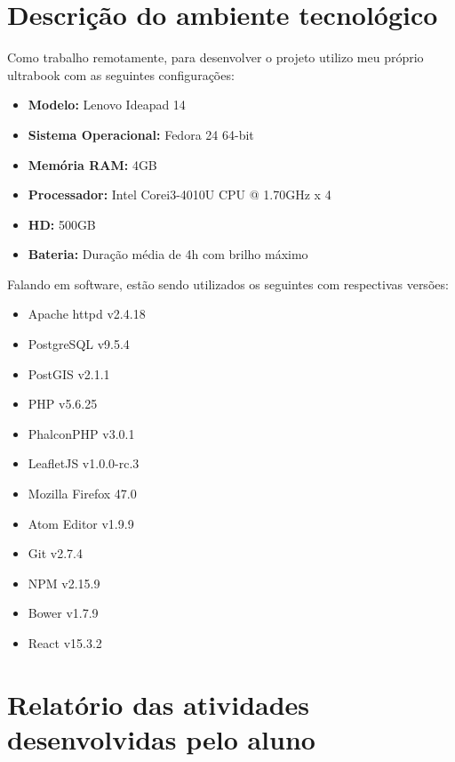 \documentclass{ufscar}
\begin{document}
\section{Descrição do ambiente tecnológico}
Como trabalho remotamente, para desenvolver o projeto utilizo meu próprio ultrabook com as seguintes configurações:
\begin{itemize}
  \item \textbf{Modelo:} Lenovo Ideapad 14
  \item \textbf{Sistema Operacional:} Fedora 24 64-bit
  \item \textbf{Memória RAM:} 4GB
  \item \textbf{Processador:} Intel\textsuperscript{\textregistered} Core\texttrademark  i3-4010U CPU @ 1.70GHz x 4
  \item \textbf{HD:} 500GB
  \item \textbf{Bateria:} Duração média de 4h com brilho máximo
\end{itemize}
Falando em software, estão sendo utilizados os seguintes com respectivas versões:
\begin{itemize}
  \item Apache httpd v2.4.18
  \item PostgreSQL v9.5.4
  \item PostGIS v2.1.1
  \item PHP v5.6.25
  \item PhalconPHP v3.0.1
  \item LeafletJS v1.0.0-rc.3
  \item Mozilla Firefox 47.0
  \item Atom Editor v1.9.9
  \item Git v2.7.4
  \item NPM v2.15.9
  \item Bower v1.7.9
  \item React v15.3.2
\end{itemize}

\section{Relatório das atividades desenvolvidas pelo aluno}
\end{document}

